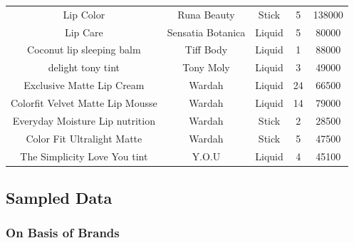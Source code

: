 \documentclass{article}
\begin{document}
\begin{longtable}{ccccc}
    Lip Color                               & Runa Beauty       & Stick                        & 5               & 138000         \\
    Lip Care                                & Sensatia Botanica & Liquid                       & 5               & 80000          \\
    Coconut lip sleeping balm               & Tiff Body         & Liquid                       & 1               & 88000          \\
    delight tony tint                       & Tony Moly         & Liquid                       & 3               & 49000          \\
    Exclusive Matte Lip Cream               & Wardah            & Liquid                       & 24              & 66500          \\
    Colorfit Velvet Matte Lip Mousse        & Wardah            & Liquid                       & 14              & 79000          \\
    Everyday Moisture Lip nutrition         & Wardah            & Stick                        & 2               & 28500          \\
    Color Fit Ultralight Matte              & Wardah            & Stick                        & 5               & 47500          \\
    The Simplicity Love You tint            & Y.O.U             & Liquid                       & 4               & 45100          \\
\end{longtable}

\restoregeometry %

\subsection{Sampled Data}
\subsubsection{On Basis of Brands}
\end{document}
